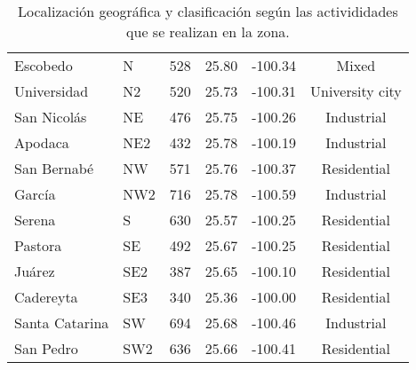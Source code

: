\begin{table}[H]
\begin{tabular}{llcccc}
        Escobedo       & N    & 528             & 25.80    & -100.34   & Mixed           \\
        Universidad    & N2   & 520             & 25.73    & -100.31   & University city \\
        San Nicolás    & NE   & 476             & 25.75    & -100.26   & Industrial      \\
        Apodaca        & NE2  & 432             & 25.78    & -100.19   & Industrial      \\
        San Bernabé    & NW   & 571             & 25.76    & -100.37   & Residential     \\
        García         & NW2  & 716             & 25.78    & -100.59   & Industrial      \\
        Serena         & S    & 630             & 25.57    & -100.25   & Residential     \\
        Pastora        & SE   & 492             & 25.67    & -100.25   & Residential     \\
        Juárez         & SE2  & 387             & 25.65    & -100.10   & Residential     \\
        Cadereyta      & SE3  & 340             & 25.36    & -100.00   & Residential     \\
        Santa Catarina & SW   & 694             & 25.68    & -100.46   & Industrial      \\
        San Pedro      & SW2  & 636             & 25.66    & -100.41   & Residential     \\ \hline
    \end{tabular}
    \caption{Localización geográfica y clasificación según las activididades que se realizan en la zona.}
    \label{table:stations_loc}
\end{table}